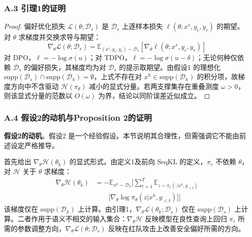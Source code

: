 \documentclass[lettersize,journal]{IEEEtran}
\begin{document}
\subsubsection*{A.3 引理1的证明}\label{app:3}
\begin{proof}
偏好优化损失 $\mathcal{L}(\theta; \mathcal{D}_s)$ 是 $\mathcal{D}_s$ 上逐样本损失 $\ell(\theta; x^s, y_c, y_r)$ 的期望。对 $\theta$ 求梯度并交换求导与期望：
\begin{equation}
    \nabla_{\theta} \mathcal{L}(\theta; \mathcal{D}_s) = \mathbb{E}_{(x^s, y_c, y_r) \sim \mathcal{D}_s} \left[ \nabla_{\theta} \ell(\theta; x^s, y_c, y_r) \right]
\end{equation}
对 DPO，$\ell = -\log\sigma(u)$；对 TDPO，$\ell = -\log\sigma(u - \delta)$；无论何种仅依赖 $\mathcal{D}_s$ 的偏好损失，其梯度均为对 $\mathcal{D}_s$ 的提示取期望。由假设1 的理想化 $\mathrm{supp}(\mathcal{D}_s) \cap \mathrm{supp}(\mathcal{D}_h) = \emptyset$，上式不存在对 $x^h \in \mathrm{supp}(\mathcal{D}_h)$ 的积分项，故梯度方向中不含驱动 $\mathcal{H}(\pi_{\theta})$ 减小的显式分量。若两支撑集存在重叠测度 $\omega > 0$，则该显式分量的范数以 $O(\omega)$ 为界，结论以同阶误差近似成立。
\end{proof}
 
\subsubsection*{A.4 假设2的动机与Proposition 2的证明}\label{app:4}
 
\textbf{假设2的动机}。假设2 是一个经验假设。本节说明其合理性，但需强调它不能由前述设定严格推导。
 
首先给出 $\nabla_\theta \mathcal{H}(\theta_k)$ 的显式形式。由定义1及前向 SeqKL 的定义，$\pi_r$ 不依赖 $\theta$，对 $\mathcal{H}$ 关于 $\theta$ 求梯度：
\begin{equation}
\begin{aligned}
\nabla_\theta \mathcal{H}(\theta_k) 
&= -\mathbb{E}_{x^h \sim \mathcal{D}_h}\bigg[\sum_{t=1}^T 
\mathbb{E}_{z \sim \pi_r(\cdot|x^h, y_{<t})} \\
&\qquad \big[\nabla_\theta \log\pi_\theta(z|x^h, y_{<t})\big]\bigg]
\end{aligned}
\end{equation}
该梯度仅在 $\mathrm{supp}(\mathcal{D}_h)$ 上计算。由引理1，$\nabla_\theta \mathcal{L}(\theta_k; \mathcal{D}_s)$ 仅在 $\mathrm{supp}(\mathcal{D}_s)$ 上计算。二者作用于语义不相交的输入集合：$\nabla_\theta \mathcal{H}$ 反映模型在良性查询上回归 $\pi_r$ 所需的参数调整方向，$\nabla_\theta \mathcal{L}(\theta; \mathcal{D}_s)$ 反映在红队攻击上改善安全偏好所需的方向。
 
\end{document}
